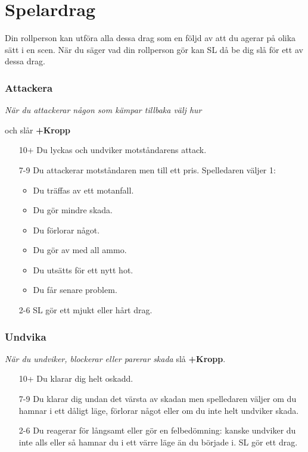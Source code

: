 \clearpage
\part{Spelardrag}
Din rollperson kan utföra alla dessa drag som en följd av att du agerar på olika sätt i en scen. När du säger vad din rollperson gör kan SL då be dig slå för ett av dessa drag.
\section{Attackera}
\textit{När du attackerar någon som kämpar tillbaka välj hur}

och slår \textbf{+Kropp}
\begin{itemize}
  \item[10+] Du lyckas och undviker motståndarens attack.
  \item[7-9] Du attackerar motståndaren men till ett pris. Spelledaren väljer 1:
  \begin{itemize}
    \item Du träffas av ett motanfall.
    \item Du gör mindre skada.
    \item Du förlorar något.
    \item Du gör av med all ammo.
    \item Du utsätts för ett nytt hot.
    \item Du får senare problem.
  \end{itemize}
  \item[2-6] SL gör ett mjukt eller hårt drag.
\end{itemize}
\clearpage
\section{Undvika}
\textit{När du undviker, blockerar eller parerar skada} slå \textbf{+Kropp}.
\begin{itemize}
  \item[10+] Du klarar dig helt oskadd.
  \item[7-9] Du klarar dig undan det värsta av skadan men spelledaren väljer om du hamnar i ett dåligt läge, förlorar något eller om du inte helt undviker skada.
  \item[2-6] Du reagerar för långsamt eller gör en felbedömning: kanske undviker du inte alls eller så hamnar du i ett värre läge än du började i. SL gör ett drag.
\end{itemize}
